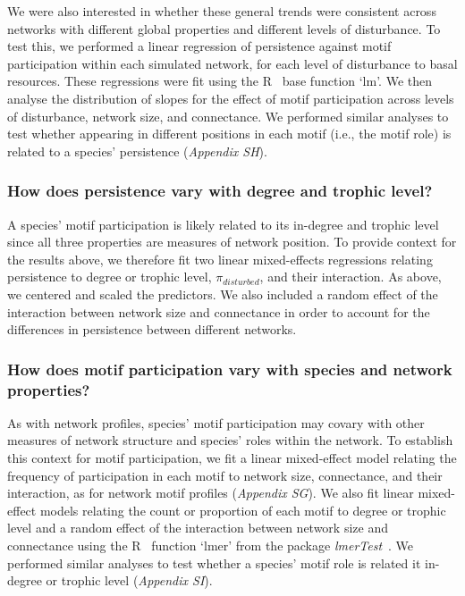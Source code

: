 \documentclass[12pt]{article}
\begin{document}
\begin{spacing}{2.0}
            We were also interested in whether these general trends were consistent across networks with different global properties and different levels of disturbance. 
            To test this, we performed a linear regression of persistence against motif participation within each simulated network, for each level of disturbance to basal resources.
            These regressions were fit using the R~\citep{R} base function `lm'.
            We then analyse the distribution of slopes for the effect of motif participation across levels of disturbance, network size, and connectance. 
            We performed similar analyses to test whether appearing in different positions in each motif (i.e., the motif role) is related to a species' persistence (\emph{Appendix SH}).

        \subsubsection*{How does persistence vary with degree and trophic level?}
        
            A species' motif participation is likely related to its in-degree and trophic level since all three properties are measures of network position.
            To provide context for the results above, we therefore fit two linear mixed-effects regressions relating persistence to degree or trophic level, $\pi_{disturbed}$, and their interaction.
            As above, we centered and scaled the predictors.
            We also included a random effect of the interaction between network size and connectance in order to account for the differences in persistence between different networks. 

        
        \subsubsection*{How does motif participation vary with species and network properties?}

            As with network profiles, species' motif participation may covary with other measures of network structure and species' roles within the network.
            To establish this context for motif participation, we fit a linear mixed-effect model relating the frequency of participation in each motif to network size, connectance, and their interaction, as for network motif profiles (\emph{Appendix SG}).
            We also fit linear mixed-effect models relating the count or proportion of each motif to degree or trophic level and a random effect of the interaction between network size and connectance using the R~\citep{R} function `lmer' from the package \emph{lmerTest}~\citep{lmerTest}.
            We performed similar analyses to test whether a species' motif role is related it in-degree or trophic level (\emph{Appendix SI}).



\end{spacing}
\end{document}
